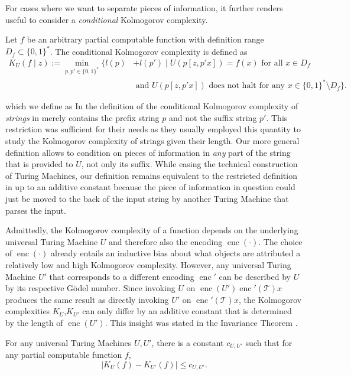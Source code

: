 For cases where we want to separate pieces of information, it further renders useful to consider a \textit{conditional} Kolmogorov complexity.
\begin{definition}
	\label{def:conditional-kolmogorov-complexity}
	Let $f$ be an arbitrary partial computable function with definition range $D_f\subset\{0,1\}^{*}$.
	The conditional Kolmogorov complexity is defined as
	\begin{align}
		\label{eq:conditional-kolmogorov-complexity}
		K_U(f\mid z):=\min_{p,p'\in\{0,1\}^{*}}\{l(p)&+l(p')\mid U(p[z,p
		'x])=f(x) \text{ for all } x\in D_f \\
		&\text{ and } U(p[z,p
		'x]) \text{ does not halt for any }x\in\{0,1\}^{*}\setminus D_f\}.
	\end{align}
\end{definition} which we define as
In the definition of the conditional Kolmogorov complexity of \textit{strings} in \cite{li2008kolmogorov} merely contains the prefix string $p$ and not the suffix string $p'$.
This restriction was sufficient for their needs as they usually employed this quantity to study the Kolmogorov complexity of strings given their length.
Our more general definition allows to condition on pieces of information in \textit{any} part of the string that is provided to $U$, not only its suffix.
While easing the technical construction of Turing Machines, our definition remains equivalent to the restricted definition in \cite{li2008kolmogorov} up to an additive constant because the piece of information in question could just be moved to the back of the input string by another Turing Machine that parses the input.

Admittedly, the Kolmogorov complexity of a function depends on the underlying universal Turing Machine $U$ and therefore also the encoding $\operatorname{enc}(\cdot)$.
The choice of $\operatorname{enc}(\cdot)$ already entails an inductive bias about what objects are attributed a relatively low and high Kolmogorov complexity.
However, any universal Turing Machine $U'$ that corresponds to a different encoding $\operatorname{enc}'$ can be described by $U$ by its respective G\"odel number.
Since invoking $U$ on $\operatorname{enc}(U')\operatorname{enc}'(\mathcal{T})x$ produces the same result as directly invoking $U'$ on $\operatorname{enc}'(\mathcal{T})x$, the Kolmogorov complexities $K_U$,$K_{U'}$ can only differ by an additive constant that is determined by the length of $\operatorname{enc}(U')$.
This insight was stated in the Invariance Theorem \cite[Section 2.1]{li2008kolmogorov}.
\begin{theorem}
	For any universal Turing Machines $U,U'$, there is a constant $c_{U,U'}$ such that for any partial computable function $f$,
	\begin{equation}
		|K_U(f)-K_{U'}(f)|\leq c_{U,U'}.
	\end{equation}
\end{theorem}

